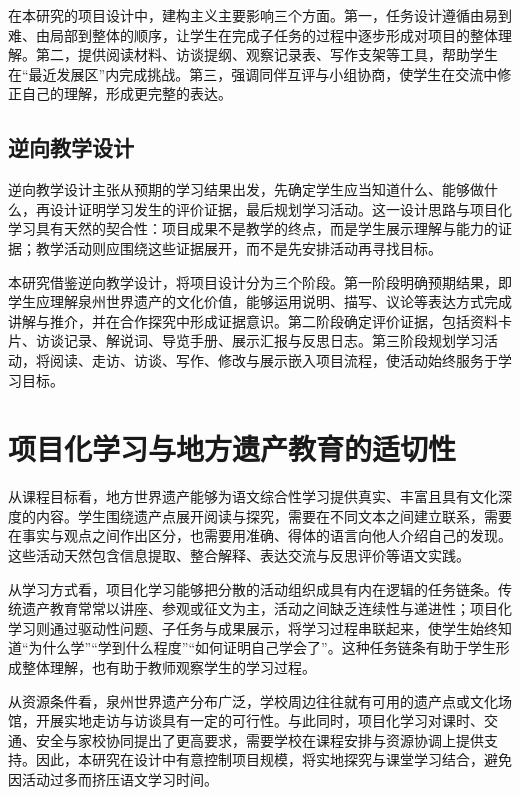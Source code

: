 在本研究的项目设计中，建构主义主要影响三个方面。第一，任务设计遵循由易到难、由局部到整体的顺序，让学生在完成子任务的过程中逐步形成对项目的整体理解。第二，提供阅读材料、访谈提纲、观察记录表、写作支架等工具，帮助学生在“最近发展区”内完成挑战。第三，强调同伴互评与小组协商，使学生在交流中修正自己的理解，形成更完整的表达。

\subsection{逆向教学设计}

逆向教学设计主张从预期的学习结果出发，先确定学生应当知道什么、能够做什么，再设计证明学习发生的评价证据，最后规划学习活动\cite{wiggins2005}。这一设计思路与项目化学习具有天然的契合性：项目成果不是教学的终点，而是学生展示理解与能力的证据；教学活动则应围绕这些证据展开，而不是先安排活动再寻找目标。

本研究借鉴逆向教学设计，将项目设计分为三个阶段。第一阶段明确预期结果，即学生应理解泉州世界遗产的文化价值，能够运用说明、描写、议论等表达方式完成讲解与推介，并在合作探究中形成证据意识。第二阶段确定评价证据，包括资料卡片、访谈记录、解说词、导览手册、展示汇报与反思日志。第三阶段规划学习活动，将阅读、走访、访谈、写作、修改与展示嵌入项目流程，使活动始终服务于学习目标。

\section{项目化学习与地方遗产教育的适切性}

从课程目标看，地方世界遗产能够为语文综合性学习提供真实、丰富且具有文化深度的内容。学生围绕遗产点展开阅读与探究，需要在不同文本之间建立联系，需要在事实与观点之间作出区分，也需要用准确、得体的语言向他人介绍自己的发现。这些活动天然包含信息提取、整合解释、表达交流与反思评价等语文实践。

从学习方式看，项目化学习能够把分散的活动组织成具有内在逻辑的任务链条。传统遗产教育常常以讲座、参观或征文为主，活动之间缺乏连续性与递进性；项目化学习则通过驱动性问题、子任务与成果展示，将学习过程串联起来，使学生始终知道“为什么学”“学到什么程度”“如何证明自己学会了”。这种任务链条有助于学生形成整体理解，也有助于教师观察学生的学习过程。

从资源条件看，泉州世界遗产分布广泛，学校周边往往就有可用的遗产点或文化场馆，开展实地走访与访谈具有一定的可行性。与此同时，项目化学习对课时、交通、安全与家校协同提出了更高要求，需要学校在课程安排与资源协调上提供支持。因此，本研究在设计中有意控制项目规模，将实地探究与课堂学习结合，避免因活动过多而挤压语文学习时间。

